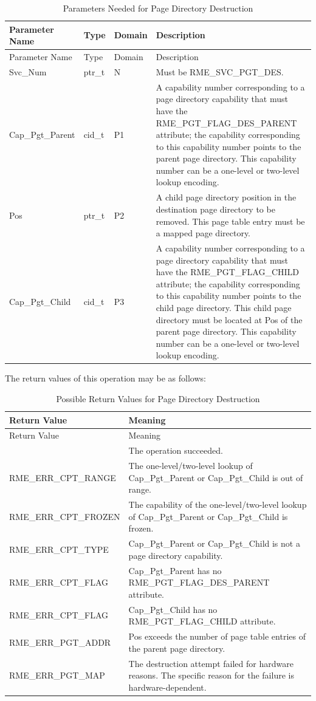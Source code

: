 \begin{xltabular}{\textwidth}{@{}>{\hsize\raggedright\arraybackslash}X>{\hsize\raggedright\arraybackslash}X>{\hsize\raggedright\arraybackslash}X>{\hsize\raggedright\arraybackslash}X@{}}
\caption{Parameters Needed for Page Directory Destruction}\label{tab:3-20-destruct-page-directory-parameters}\\
\toprule
Parameter Name & Type & Domain & Description\tabularnewline
\endfirsthead
\toprule
Parameter Name & Type & Domain & Description\tabularnewline
\midrule
\endhead
\bottomrule
\endlastfoot
Svc\_Num & ptr\_t & N & Must be RME\_SVC\_PGT\_DES.\tabularnewline
Cap\_Pgt\_Parent & cid\_t & P1 &
A capability number corresponding to a page directory capability that must have the RME\_PGT\_FLAG\_DES\_PARENT attribute; the capability corresponding to this capability number points to the parent page directory. This capability number can be a one-level or two-level lookup encoding.\tabularnewline
Pos & ptr\_t & P2 &
A child page directory position in the destination page directory to be removed. This page table entry must be a mapped page directory.\tabularnewline
Cap\_Pgt\_Child & cid\_t & P3 &
A capability number corresponding to a page directory capability that must have the RME\_PGT\_FLAG\_CHILD attribute; the capability corresponding to this capability number points to the child page directory. This child page directory must be located at Pos of the parent page directory. This capability number can be a one-level or two-level lookup encoding.\tabularnewline
\end{xltabular}
\nopagebreak[4]

The return values of this operation may be as follows:

\begin{xltabular}{\textwidth}{@{}>{\hsize\raggedright\arraybackslash}X>{\hsize\raggedright\arraybackslash}X@{}}
\caption{Possible Return Values for Page Directory Destruction}\label{tab:3-21-destruct-page-directory-return-values}\\
\toprule
Return Value & Meaning\tabularnewline
\endfirsthead
\toprule
Return Value & Meaning\tabularnewline
\midrule
\endhead
\bottomrule
{} & The operation succeeded.\tabularnewline
    RME\_ERR\_CPT\_RANGE & The one-level/two-level lookup of Cap\_Pgt\_Parent or Cap\_Pgt\_Child is out of range.\tabularnewline
    RME\_ERR\_CPT\_FROZEN & The capability of the one-level/two-level lookup of Cap\_Pgt\_Parent or Cap\_Pgt\_Child is frozen.\tabularnewline
    RME\_ERR\_CPT\_TYPE & Cap\_Pgt\_Parent or Cap\_Pgt\_Child is not a page directory capability.\tabularnewline
    RME\_ERR\_CPT\_FLAG & Cap\_Pgt\_Parent has no RME\_PGT\_FLAG\_DES\_PARENT attribute.\tabularnewline
    RME\_ERR\_CPT\_FLAG & Cap\_Pgt\_Child has no RME\_PGT\_FLAG\_CHILD attribute.\tabularnewline
    RME\_ERR\_PGT\_ADDR & Pos exceeds the number of page table entries of the parent page directory.\tabularnewline
    RME\_ERR\_PGT\_MAP & The destruction attempt failed for hardware reasons. The specific reason for the failure is hardware-dependent.\tabularnewline
\end{xltabular}
\nopagebreak[4]

